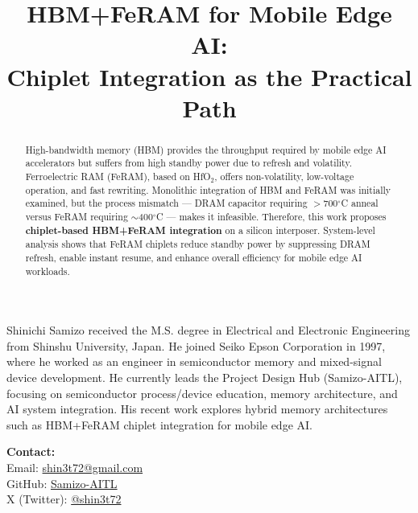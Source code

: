 \documentclass[10pt,conference]{IEEEtran}
\title{HBM+FeRAM for Mobile Edge AI:\\
Chiplet Integration as the Practical Path}
\author{%
  \IEEEauthorblockN{Shinichi Samizo}%
  \IEEEauthorblockA{Project Design Hub (Samizo-AITL), Japan\\
  Email: \href{mailto:shin3t72@gmail.com}{shin3t72@gmail.com}}%
}
\begin{document}
\maketitle

\begin{abstract}
High-bandwidth memory (HBM) provides the throughput required by mobile edge AI accelerators but suffers from high standby power due to refresh and volatility.
Ferroelectric RAM (FeRAM), based on HfO$_2$, offers non-volatility, low-voltage operation, and fast rewriting.
Monolithic integration of HBM and FeRAM was initially examined, but the process mismatch --- DRAM capacitor requiring $>$700$^\circ$C anneal versus FeRAM requiring $\sim$400$^\circ$C --- makes it infeasible.
Therefore, this work proposes \textbf{chiplet-based HBM+FeRAM integration} on a silicon interposer.
System-level analysis shows that FeRAM chiplets reduce standby power by suppressing DRAM refresh, enable instant resume, and enhance overall efficiency for mobile edge AI workloads.
\end{abstract}






\nocite{ChoiIEDM2022,KimIEDM2021,MuellerIEDM2012,MartinVLSI2020,NohedaNature2023}

\IEEEtriggercmd{\columnbreak}




\begingroup\small
\vspace{0.25\baselineskip}
\begin{IEEEbiographynophoto}{Shinichi Samizo}
received the M.S. degree in Electrical and Electronic Engineering from Shinshu University, Japan.
He joined Seiko Epson Corporation in 1997, where he worked as an engineer in semiconductor memory and mixed-signal device development.
He currently leads the Project Design Hub (Samizo-AITL), focusing on semiconductor process/device education, memory architecture, and AI system integration.
His recent work explores hybrid memory architectures such as HBM+FeRAM chiplet integration for mobile edge AI.

\textbf{Contact:}\\
Email: \href{mailto:shin3t72@gmail.com}{shin3t72@gmail.com}\\
GitHub: \href{https://github.com/Samizo-AITL}{Samizo-AITL}\\
X (Twitter): \href{https://x.com/shin3t72}{@shin3t72}
\end{IEEEbiographynophoto}
\endgroup
\end{document}
